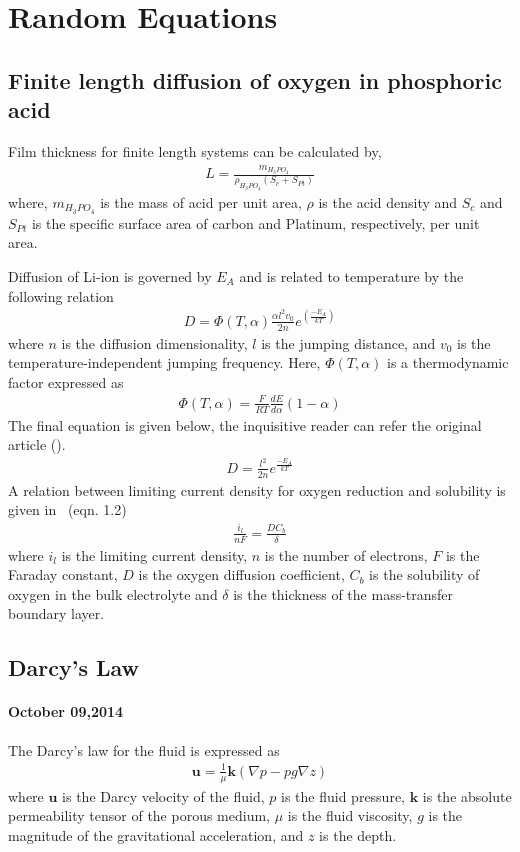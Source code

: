 \documentclass[12pt]{book}
\begin{document}
\section{Random Equations}

\subsection{Finite length diffusion of oxygen in phosphoric acid}
Film thickness for finite length systems can be calculated by,
\begin{align}
L=\frac{m_{H_3PO_4}}{\rho_{H_3PO_4}\left(S_c+S_{Pt}\right)}
\end{align}
where, $m_{H_3PO_4}$ is the mass of acid per unit area, $\rho$ is the acid density and $S_c$ and $S_{Pt}$ is the specific surface area of carbon and Platinum, respectively, per unit area.

Diffusion of Li-ion is governed by $E_A$ and is related to temperature by the following relation 
\begin{align}
D=\Phi(T,\alpha)\frac{\alpha l^2 v_0}{2n}e^{\left(\frac{-E_A}{kT}\right)}
\end{align}
where $n$ is the diffusion dimensionality, $l$ is the jumping distance, and $v_0$ is the temperature-independent jumping frequency. Here, $\Phi(T,\alpha)$ is a thermodynamic factor expressed as
\begin{align}
\Phi(T,\alpha)=\frac{F}{RT}\frac{dE}{d\alpha}(1-\alpha)
\end{align}
The final equation is given below, the inquisitive reader can refer the original article (\cite{Okubo2009}). 
\begin{align}
D=\frac{l^2}{2n}e^{\frac{-E_A}{kT}}
\end{align}
A relation between limiting current density for oxygen reduction and solubility is given in~\cite{Kinoshita1992} (eqn. 1.2)
\begin{align}
\frac{i_l}{nF}=\frac{DC_b}{\delta}
\end{align}
where $i_l$ is the limiting current density, $n$ is the number of electrons, $F$ is the Faraday constant, $D$ is the oxygen diffusion coefficient, $C_b$ is the solubility of oxygen in the bulk electrolyte and $\delta$ is the thickness of the mass-transfer boundary layer.
\subsection{Darcy's Law}
\paragraph*{October 09,2014} The Darcy's law for the fluid is expressed as \cite{Shen2007}
\begin{align}
\boldsymbol{u}=\frac{1}{\mu}\boldsymbol{k}\left(\nabla p-pg\nabla z\right)
\end{align}
where $\boldsymbol{u}$ is the Darcy velocity of the fluid, $p$ is the fluid pressure, $\boldsymbol{k}$ is the absolute permeability tensor of the porous medium, $\mu$ is the fluid viscosity, $g$ is the magnitude of the gravitational acceleration, and $z$ is the depth.
\end{document}

